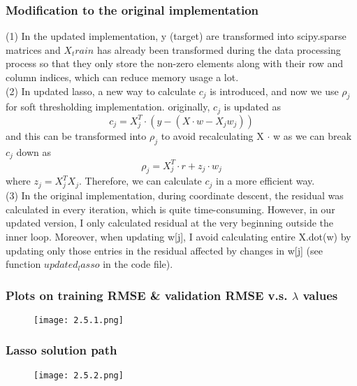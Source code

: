 \documentclass{article}
\begin{document}
\subsubsection*{Modification to the original implementation}
(1) In the updated implementation, y (target) are transformed into scipy.sparse matrices and $X_train$ has already been transformed during the data processing process so that
they only store the non-zero elements along with their row and column indices, which can reduce memory usage a lot. \\
(2) In updated lasso, a new way to calculate $c_j$ is introduced, and now we use $\rho_j$ for soft thresholding implementation.
originally, $c_j$ is updated as
\[c_j = X^T_j \cdot (y - (X \cdot w - X_j w_j))\]
and this can be transformed into $\rho_j$ to avoid recalculating X $\cdot$ w as we can break $c_j$ down as
\[\rho_j = X^T_j \cdot r + z_j \cdot w_j\] where $z_j = X^T_j X_j$. Therefore, we can calculate $c_j$ in a more efficient way.\\
(3) In the original implementation, during coordinate descent, the residual was calculated in every iteration, which is quite time-consuming.
However, in our updated version, I only calculated residual at the very beginning outside the inner loop. Moreover, when updating w[j], I avoid calculating entire X.dot(w) by updating only those entries in the residual affected by changes in w[j] (see function $updated_lasso$ in the code file).

\subsubsection*{Plots on training RMSE \& validation RMSE v.s. $\lambda$ values}
\begin{figure}[h]
    \centering
    \texttt{[image: 2.5.1.png]}
\end{figure}

\subsubsection*{Lasso solution path}
\begin{figure}[h]
    \centering
    \texttt{[image: 2.5.2.png]}
\end{figure}
\newpage
\end{document}
